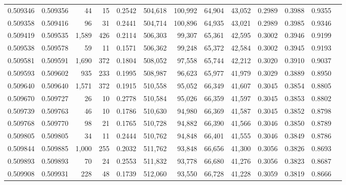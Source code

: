 \begin{tabular}{rrrrrrrrrrrrr}
0.509346 & 0.509356 &    44 &    15 &                                     0.2542 & 504,618 & 100,992 &  64,904 &  43,052 & 0.2989 & 0.3988 & 0.9355 \\
0.509358 & 0.509416 &    96 &    31 &                                     0.2441 & 504,714 & 100,896 &  64,935 &  43,021 & 0.2989 & 0.3985 & 0.9346 \\
0.509419 & 0.509535 & 1,589 &   426 &                                     0.2114 & 506,303 &  99,307 &  65,361 &  42,595 & 0.3002 & 0.3946 & 0.9199 \\
0.509538 & 0.509578 &    59 &    11 &                                     0.1571 & 506,362 &  99,248 &  65,372 &  42,584 & 0.3002 & 0.3945 & 0.9193 \\
0.509581 & 0.509591 & 1,690 &   372 &                                     0.1804 & 508,052 &  97,558 &  65,744 &  42,212 & 0.3020 & 0.3910 & 0.9037 \\
0.509593 & 0.509602 &   935 &   233 &                                     0.1995 & 508,987 &  96,623 &  65,977 &  41,979 & 0.3029 & 0.3889 & 0.8950 \\
0.509640 & 0.509640 & 1,571 &   372 &                                     0.1915 & 510,558 &  95,052 &  66,349 &  41,607 & 0.3045 & 0.3854 & 0.8805 \\
0.509670 & 0.509727 &    26 &    10 &                                     0.2778 & 510,584 &  95,026 &  66,359 &  41,597 & 0.3045 & 0.3853 & 0.8802 \\
0.509739 & 0.509763 &    46 &    10 &                                     0.1786 & 510,630 &  94,980 &  66,369 &  41,587 & 0.3045 & 0.3852 & 0.8798 \\
0.509768 & 0.509770 &    98 &    21 &                                     0.1765 & 510,728 &  94,882 &  66,390 &  41,566 & 0.3046 & 0.3850 & 0.8789 \\
0.509805 & 0.509805 &    34 &    11 &                                     0.2444 & 510,762 &  94,848 &  66,401 &  41,555 & 0.3046 & 0.3849 & 0.8786 \\
0.509844 & 0.509885 & 1,000 &   255 &                                     0.2032 & 511,762 &  93,848 &  66,656 &  41,300 & 0.3056 & 0.3826 & 0.8693 \\
0.509893 & 0.509893 &    70 &    24 &                                     0.2553 & 511,832 &  93,778 &  66,680 &  41,276 & 0.3056 & 0.3823 & 0.8687 \\
0.509908 & 0.509931 &   228 &    48 &                                     0.1739 & 512,060 &  93,550 &  66,728 &  41,228 & 0.3059 & 0.3819 & 0.8666 \\

\end{tabular}
